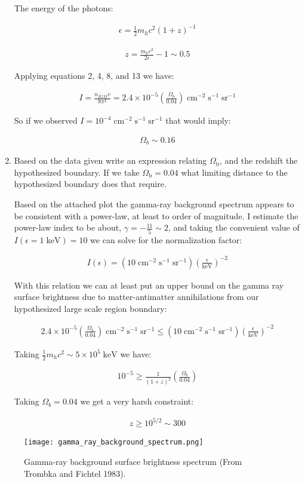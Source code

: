 \documentclass{article}
\def\beq{\begin{eqnarray}}
\def\eeq{\end{eqnarray}}
\begin{document}
\begin{enumerate}
  The energy of the photons:

  \beq
  \epsilon = \frac{1}{2} m_h c^2 (1 + z)^{-1}
  \eeq

  \beq
  z = \frac{m_h c^2}{2 \epsilon} - 1 \sim 0.5 
  \eeq

  Applying equations 2, 4, 8, and 13 we have:

  \beq
  I = \frac{n_{IGM} v}{8 \pi^2} = 2.4 \times 10^{-5} \left( \frac{\Omega_b}{0.04} \right) \; \mathrm{cm^{-2}} \; \mathrm{s^{-1}} \; \mathrm{sr^{-1}}
  \eeq

  So if we observed $I = 10^{-4} \; \mathrm{cm^{-2}} \; \mathrm{s^{-1}} \; \mathrm{sr^{-1}}$ that would imply:

  \beq
  \Omega_b \sim 0.16
  \eeq

\item Based on the data given write an expression relating $\Omega_\mathrm{b}$, and the redshift the hypothesized boundary. If we take $\Omega_\mathrm{b} = 0.04$ what limiting distance to the hypothesized boundary does that require.

  Based on the attached plot the gamma-ray background spectrum appears to be consistent with a power-law, at least to order of magnitude. I estimate the power-law index to be about, $\gamma = -\frac{11}{5} \sim 2$, and taking the convenient value of $I(\epsilon = 1 \; \mathrm{keV}) = 10$ we can solve for the normalization factor:

  \beq
  I(\epsilon) = (10 \; \mathrm{cm^{-2}} \; \mathrm{s^{-1}} \; \mathrm{sr^{-1}}) \left( \frac{\epsilon}{\mathrm{keV}} \right)^{-2}
  \eeq

  With this relation we can at least put an upper bound on the gamma ray surface brightness due to matter-antimatter annihilations from our hypothesized large scale region boundary:

  \beq
  2.4 \times 10^{-5} \left( \frac{\Omega_b}{0.04} \right) \; \mathrm{cm^{-2}} \; \mathrm{s^{-1}} \; \mathrm{sr^{-1}} \leq (10 \; \mathrm{cm^{-2}} \; \mathrm{s^{-1}} \; \mathrm{sr^{-1}}) \left( \frac{\epsilon}{\mathrm{keV}} \right)^{-2}
  \eeq

  Taking $\frac{1}{2} m_h c^2 \sim 5 \times 10^5 \; \mathrm{keV}$ we have:

  \beq
  10^{-5} \geq \frac{1}{(1 + z)^2} \left( \frac{\Omega_b}{0.04} \right)
  \eeq

  Taking $\Omega_b = 0.04$ we get a very harsh constraint:

  \beq
  z \geq 10^{5/2} \sim 300
  \eeq

\end{enumerate}

\begin{figure}
\begin{center}
\texttt{[image: gamma\_ray\_background\_spectrum.png]}
\caption{Gamma-ray background surface brightness spectrum (From Trombka and Fichtel 1983).}
\end{center}
\end{figure}
\end{document}
